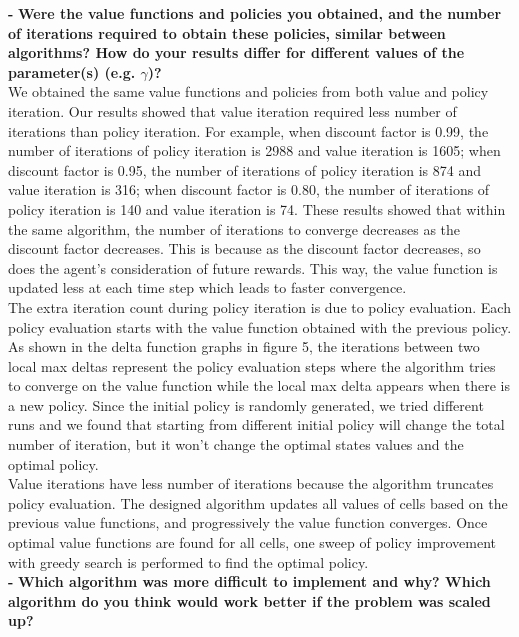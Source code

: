 \documentclass[11pt]{article}
\begin{document}
\noindent
\textbf{-}
\noindent
\textbf{Were the value functions and policies you obtained, and the number of
iterations required to obtain these policies, similar between algorithms? How do
your results differ for different values of the parameter(s) (e.g. $\gamma$)?}
\\

\noindent
We obtained the same value functions and policies from both value and policy
iteration. Our results showed that value iteration required less number of
iterations than policy iteration. For example, when discount factor is 0.99, the
number of iterations of policy iteration is 2988 and value iteration is 1605;
when discount factor is 0.95, the number of iterations of policy iteration is
874 and value iteration is 316; when discount factor is 0.80, the number of
iterations of policy iteration is 140 and value iteration is 74. These results
showed that within the same algorithm, the number of iterations to converge
decreases as the discount factor decreases. This is because as the discount
factor decreases, so does the agent's consideration of future rewards. This way,
the value function is updated less at each time step which leads to faster
convergence. \\

\noindent
The extra iteration count during policy iteration is due to policy evaluation.
Each policy evaluation starts with the value function obtained with the previous
policy. As shown in the delta function graphs in figure 5, the iterations
between two local max deltas represent the policy evaluation steps where the
algorithm tries to converge on the value function while the local max delta
appears when there is a new policy. Since the initial policy is randomly
generated, we tried different runs and we found that starting from different
initial policy will change the total number of iteration, but it won’t change
the optimal states values and the optimal policy. \\

\noindent
Value iterations have less number of iterations because the algorithm truncates
policy evaluation. The designed algorithm updates all values of cells based on
the previous value functions, and progressively the value function converges.
Once optimal value functions are found for all cells, one sweep of policy
improvement with greedy search is performed to find the optimal policy. \\

\noindent
\textbf{-}
\noindent
\textbf{Which algorithm was more difficult to implement and why? Which algorithm
do you think would work better if the problem was scaled up?}
\\
\end{document}
